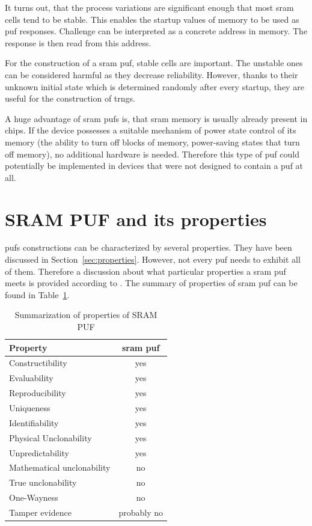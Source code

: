 It turns out, that the process variations are significant enough that most \gls{sram} cells tend to be stable. This enables the startup values of memory to be used as \gls{puf} responses. Challenge can be interpreted as a concrete address in memory. The response is then read from this address.\cite{Maes2013}

For the construction of a \gls{sram} \gls{puf}, stable cells are important. The unstable ones can be considered harmful as they decrease reliability. However, thanks to their unknown initial state which is determined randomly after every startup, they are useful for the construction of \glspl{trng}.\cite{Holcomb2009}

A huge advantage of \gls{sram} \glspl{puf} is, that \gls{sram} memory is usually already present in chips. If the device possesses a suitable mechanism of power state control of its memory (the ability to turn off blocks of memory, power-saving states that turn off memory), no additional hardware is needed. Therefore this type of \gls{puf} could potentially be implemented in devices that were not designed to contain a \gls{puf} at all.

\section{SRAM PUF and its properties}\label{sec:srampuf_properties}

\glspl{puf} constructions can be characterized by several properties. They have been discussed in Section~\ref{sec:properties}. However, not every \gls{puf} needs to exhibit all of them. Therefore a discussion about what particular properties a \gls{sram} \gls{puf} meets is provided according to \cite{Maes2013}. The summary of properties of \gls{sram} \gls{puf} can be found in Table~\ref{table:sram_puf_properties}.

\begin{table}[ht!]
\centering
\begin{tabular}{l c} 
    \textbf{Property} & \textbf{\gls{sram} \gls{puf}} \\
     \hline
    Constructibility & yes\\ 
    Evaluability & yes\\
    Reproducibility & yes\\
    Uniqueness & yes\\
    Identifiability & yes\\ 
    Physical Unclonability & yes\\
    Unpredictability & yes\\
    Mathematical unclonability & no\\
    True unclonability & no\\
    One-Wayness & no\\
    Tamper evidence & probably no\\
     \hline
    \end{tabular}
    \captionsetup{justification=centering,margin=0.5cm}
    \caption{Summarization of properties of SRAM PUF}
    \label{table:sram_puf_properties}
\end{table}



